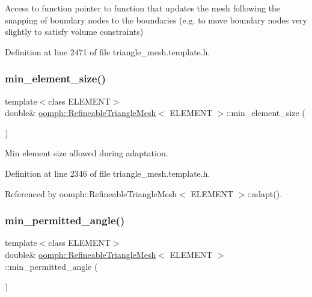 Access to function pointer to function that updates the mesh following the snapping of boundary nodes to the boundaries (e.\+g. to move boundary nodes very slightly to satisfy volume constraints) 



Definition at line 2471 of file triangle\+\_\+mesh.\+template.\+h.

\mbox{\label{classoomph_1_1RefineableTriangleMesh_ad25cf23f688c1007b5fbbe41d2ec6cfc}} 
\subsubsection{\texorpdfstring{min\+\_\+element\+\_\+size()}{min\_element\_size()}}
{\footnotesize\ttfamily template$<$class E\+L\+E\+M\+E\+NT$>$ \\
double\& \hyperlink{classoomph_1_1RefineableTriangleMesh}{oomph\+::\+Refineable\+Triangle\+Mesh}$<$ E\+L\+E\+M\+E\+NT $>$\+::min\+\_\+element\+\_\+size (\begin{DoxyParamCaption}{ }\end{DoxyParamCaption})\hspace{0.3cm}{\ttfamily [inline]}}



Min element size allowed during adaptation. 



Definition at line 2346 of file triangle\+\_\+mesh.\+template.\+h.



Referenced by oomph\+::\+Refineable\+Triangle\+Mesh$<$ E\+L\+E\+M\+E\+N\+T $>$\+::adapt().

\mbox{\label{classoomph_1_1RefineableTriangleMesh_a85f0515f33a727c75b80bfbbfe4b53f9}} 
\subsubsection{\texorpdfstring{min\+\_\+permitted\+\_\+angle()}{min\_permitted\_angle()}}
{\footnotesize\ttfamily template$<$class E\+L\+E\+M\+E\+NT$>$ \\
double\& \hyperlink{classoomph_1_1RefineableTriangleMesh}{oomph\+::\+Refineable\+Triangle\+Mesh}$<$ E\+L\+E\+M\+E\+NT $>$\+::min\+\_\+permitted\+\_\+angle (\begin{DoxyParamCaption}{ }\end{DoxyParamCaption})\hspace{0.3cm}{\ttfamily [inline]}}



